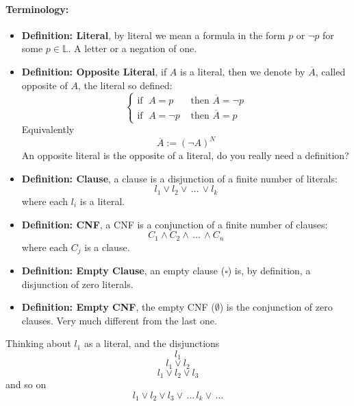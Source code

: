 	\paragraph{Terminology: }
	\begin{itemize}
		\item \textbf{Definition: Literal}, by literal we mean a formula in the form $p$ or $\neg p$ for some $p \in \mathbb{L}$. A letter or a negation of one.\\

		\item \textbf{Definition: Opposite Literal}, if $A$ is a literal, then we denote by $\overline{A}$, called opposite of $A$, the literal so defined:
		$$
		\begin{cases}
			\text{if } \; A = p & \text{ then } \overline{A} = \neg p \\
			\text{if } \; A = \neg p & \text{ then } \overline{A} = p
		\end{cases}
		$$
		Equivalently
		$$ \overline{A} := (\neg A)^N$$
		An opposite literal is the opposite of a literal, do you really need a definition?\\

		\item \textbf{Definition: Clause}, a clause is a disjunction of a finite number of literals:
		$$ l_1 \vee l_2 \vee \, \dots \, \vee l_k $$
		where each $l_i$ is a literal.\\

		\item \textbf{Definition: CNF}, a CNF is a conjunction of a finite number of clauses:
		$$ C_1 \wedge C_2 \wedge \, \dots \, \wedge C_n$$
		where each $C_j$ is a clause.\\

		\item \textbf{Definition: Empty Clause}, an empty clause ($\square$) is, by definition, a disjunction of zero literals.\\

		\item \textbf{Definition: Empty CNF}, the empty CNF ($\emptyset$) is the conjunction of zero clauses. Very much different from the last one.\\
	\end{itemize}

	Thinking about $l_1$ as a literal, and the disjunctions
	$$ l_1 $$
	$$ l_1 \vee l_2 $$
	$$ l_1 \vee l_2 \vee l_3 $$
	and so on
	$$ l_1 \vee l_2 \vee l_3 \vee \, \dots \, l_k \vee \, \dots $$

